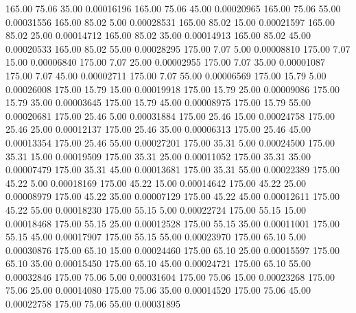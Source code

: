     165.00     75.06     35.00     0.00016196
    165.00     75.06     45.00     0.00020965
    165.00     75.06     55.00     0.00031556
    165.00     85.02      5.00     0.00028531
    165.00     85.02     15.00     0.00021597
    165.00     85.02     25.00     0.00014712
    165.00     85.02     35.00     0.00014913
    165.00     85.02     45.00     0.00020533
    165.00     85.02     55.00     0.00028295
    175.00      7.07      5.00     0.00008810
    175.00      7.07     15.00     0.00006840
    175.00      7.07     25.00     0.00002955
    175.00      7.07     35.00     0.00001087
    175.00      7.07     45.00     0.00002711
    175.00      7.07     55.00     0.00006569
    175.00     15.79      5.00     0.00026008
    175.00     15.79     15.00     0.00019918
    175.00     15.79     25.00     0.00009086
    175.00     15.79     35.00     0.00003645
    175.00     15.79     45.00     0.00008975
    175.00     15.79     55.00     0.00020681
    175.00     25.46      5.00     0.00031884
    175.00     25.46     15.00     0.00024758
    175.00     25.46     25.00     0.00012137
    175.00     25.46     35.00     0.00006313
    175.00     25.46     45.00     0.00013354
    175.00     25.46     55.00     0.00027201
    175.00     35.31      5.00     0.00024500
    175.00     35.31     15.00     0.00019509
    175.00     35.31     25.00     0.00011052
    175.00     35.31     35.00     0.00007479
    175.00     35.31     45.00     0.00013681
    175.00     35.31     55.00     0.00022389
    175.00     45.22      5.00     0.00018169
    175.00     45.22     15.00     0.00014642
    175.00     45.22     25.00     0.00008979
    175.00     45.22     35.00     0.00007129
    175.00     45.22     45.00     0.00012611
    175.00     45.22     55.00     0.00018230
    175.00     55.15      5.00     0.00022724
    175.00     55.15     15.00     0.00018468
    175.00     55.15     25.00     0.00012528
    175.00     55.15     35.00     0.00011001
    175.00     55.15     45.00     0.00017907
    175.00     55.15     55.00     0.00023970
    175.00     65.10      5.00     0.00030876
    175.00     65.10     15.00     0.00024460
    175.00     65.10     25.00     0.00015597
    175.00     65.10     35.00     0.00015450
    175.00     65.10     45.00     0.00024721
    175.00     65.10     55.00     0.00032846
    175.00     75.06      5.00     0.00031604
    175.00     75.06     15.00     0.00023268
    175.00     75.06     25.00     0.00014080
    175.00     75.06     35.00     0.00014520
    175.00     75.06     45.00     0.00022758
    175.00     75.06     55.00     0.00031895
